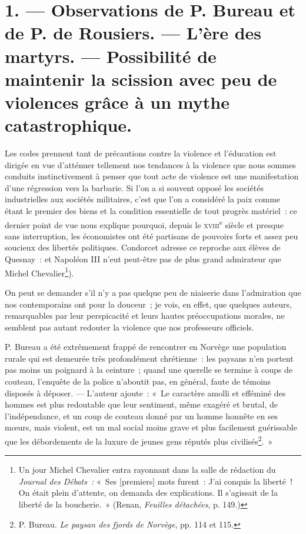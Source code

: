 \documentclass[french,twoside]{book} %
\newcommand\corr[1]{#1}
\begin{document}
\section[{1. — Observations de P. Bureau et de P. de Rousiers. — L’ère des martyrs. — Possibilité de maintenir la scission avec peu de violences grâce à un mythe catastrophique.}]{1. — Observations de P. Bureau et de P. de Rousiers. — L’ère des martyrs. — Possibilité de maintenir la scission avec peu de violences grâce à un mythe catastrophique.}
\label{p25}
\noindent Les codes prennent tant de précautions contre la violence et l’éducation est dirigée en vue d’atténuer tellement nos tendances à la violence que nous sommes conduits instinctivement à penser que tout acte de violence est une manifestation d’une régression vers la barbarie. Si l’on a si souvent opposé les sociétés industrielles aux sociétés militaires, c’est que l’on a considéré la paix comme étant le premier des biens et la condition essentielle de tout progrès matériel : ce dernier point de vue nous explique pourquoi, depuis le {\scshape xviii}\textsuperscript{e} siècle et presque  sans interruption, les économistes ont été partisans de pouvoirs forts et assez peu soucieux des libertés politiques. Condorcet adresse ce reproche aux élèves de Quesnay : et Napoléon III n’eut peut-être pas de plus grand admirateur que Michel Chevalier\footnote{ \noindent Un jour Michel Chevalier entra rayonnant dans la salle de rédaction du \emph{Journal des Débats :} « Ses [{\corr premiers}] mots furent : J’ai conquis la liberté ! On était plein d’attente, on demanda des explications. Il s’agissait de la liberté de la boucherie. » (Renan, \emph{Feuilles détachées}, p. 149.)
 }).\par
On peut se demander s’il n’y a pas quelque peu de niaiserie dans l’admiration que nos contemporains ont pour la douceur ; je vois, en effet, que quelques auteurs, remarquables par leur perspicacité et leurs hautes préoccupations morales, ne semblent pas autant redouter la violence que nos professeurs officiels.\par
P. Bureau a été extrêmement frappé de rencontrer en Norvège une population rurale qui est demeurée très profondément chrétienne : les paysans n’en portent pas moins un poignard à la ceinture ; quand une querelle se termine à coups de couteau, l’enquête de la police n’aboutit pas, en général, faute de témoins disposés à déposer. — L’auteur ajoute : « Le caractère amolli et efféminé des hommes est plus redoutable que leur sentiment, même exagéré et brutal, de l’indépendance, et un coup de couteau donné par un homme honnête en ses mœurs, mais violent, est un mal social moins grave et plus facilement guérissable que les débordements de la luxure de jeunes gens réputés plus civilisés\footnote{ \noindent P. Bureau. \emph{Le paysan des fjords de Norvège}, pp. 114 et 115.
 }. »\par
\end{document}
